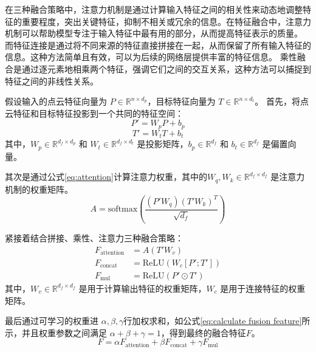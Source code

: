 在三种融合策略中，注意力机制是通过计算输入特征之间的相关性来动态地调整特征的重要程度，突出关键特征，抑制不相关或冗余的信息。在特征融合中，注意力机制可以帮助模型专注于输入特征中最有用的部分，从而提高特征表示的质量。
而特征连接是通过将不同来源的特征直接拼接在一起，从而保留了所有输入特征的信息。这种方法简单且有效，可以为后续的网络层提供丰富的特征信息。
乘性融合是通过逐元素地相乘两个特征，强调它们之间的交互关系，这种方法可以捕捉到特征之间的非线性关系。

假设输入的点云特征向量为 \( P \in \mathbb{R}^{n \times d_p} \)，目标特征向量为 \( T \in \mathbb{R}^{n \times d_t} \)。
首先，将点云特征和目标特征投影到一个共同的特征空间：
\begin{equation}
    P' = W_p P + b_p
\end{equation}
\begin{equation}
    T' = W_t T + b_t
\end{equation}
其中，\( W_p \in \mathbb{R}^{d_f \times d_p} \) 和 \( W_t \in \mathbb{R}^{d_f \times d_t} \) 是投影矩阵，\( b_p \in \mathbb{R}^{d_f} \) 和 \( b_t \in \mathbb{R}^{d_f} \) 是偏置向量。

其次是通过公式\eqref{eq:attention}计算注意力权重，其中的\( W_q, W_k \in \mathbb{R}^{d_f \times d_f} \) 是注意力机制的权重矩阵。
\begin{equation}
    \label{eq:attention}
    A = \text{softmax}\left(\frac{(P' W_q) (T' W_k)^T}{\sqrt{d_f}}\right)
\end{equation}

紧接着结合拼接、乘性、注意力三种融合策略：
\begin{align}
    F_{\text{attention}} &= A (T' W_v) \\
    F_{\text{concat}} &= \text{ReLU}(W_c [P'; T']) \\
    F_{\text{mul}} &= \text{ReLU}(P' \odot T')
\end{align}
其中，\( W_v \in \mathbb{R}^{d_f \times d_f} \) 是用于计算输出特征的权重矩阵，\( W_c \) 是用于连接特征的权重矩阵。

最后通过可学习的权重进 \(\alpha, \beta, \gamma\)行加权求和，如公式\eqref{eq:calculate fusion feature}所示，并且权重参数之间满足 \(\alpha + \beta + \gamma = 1\)，得到最终的融合特征$F$。
\begin{equation}
    \label{eq:calculate fusion feature}
    F = \alpha F_{\text{attention}} + \beta F_{\text{concat}} + \gamma F_{\text{mul}}
\end{equation}



